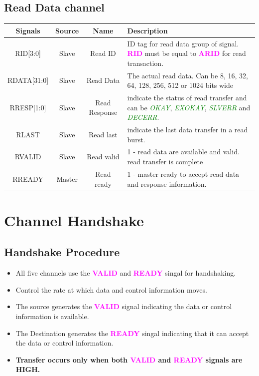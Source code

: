 \documentclass{article}
\newcommand{\AXISignals}[1]{\textbf{\textcolor{magenta}{#1}}}
\begin{document}
\subsection{Read Data channel}
\begin{table}[H]
    \begin{center}
        \begin{tabular}{c|c|c|p{9.5cm}}
            \textbf{Signals} & \textbf{Source} & \textbf{Name} & \textbf{Description}\\
            \hline
            RID[3:0] & Slave & Read ID & ID tag for read data group of signal. \AXISignals{RID} must be equal to \AXISignals{ARID} for read transaction.\\
            RDATA[31:0] & Slave & Read Data & The actual read data. Can be 8, 16, 32, 64, 128, 256, 512 or 1024 bits wide\\
            RRESP[1:0] & Slave & Read Response & indicate the status of read transfer and can be  \emph{\textcolor{green}{OKAY}}, \emph{\textcolor{green}{EXOKAY}}, \emph{\textcolor{green}{SLVERR}} and \emph{\textcolor{green}{DECERR}}.\\
            RLAST & Slave & Read last & indicate the last data transfer in a read burst.\\
            RVALID & Slave & Read valid & 1 - read data are available and valid.  read transfer is complete \\
            RREADY & Master & Read ready & 1 - master ready to accept read data and response information.\\
        \end{tabular}
    \end{center}
\end{table}

\section{Channel Handshake}
\subsection{Handshake Procedure}
\begin{itemize}
    \item All five channels use the \AXISignals{VALID} and \AXISignals{READY} singal for handshaking.
    \item Control the rate at which data and control information moves.
    \item The source generates the \AXISignals{VALID} signal indicating the data or control information is available.
    \item The Destination generates the \AXISignals{READY} singal indicating that it can accept the data or control information.
    \item \textbf{Transfer occurs only when both \AXISignals{VALID} and \AXISignals{READY} signals are HIGH.}
\end{itemize}
\end{document}
